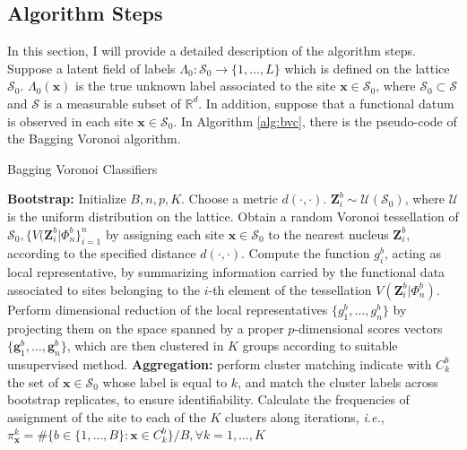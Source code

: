 \subsection{Algorithm Steps}
\label{subsec:algsteps}
In this section, I will provide a detailed description of the algorithm steps.
Suppose a latent field of labels $\Lambda_0:\mathcal{S}_0 \rightarrow \{1,\dots,L\}$ which is defined on the lattice $\mathcal{S}_0$. $\Lambda_0(\mathbf{x})$ is the true unknown label associated to the site $\mathbf{x}\in\mathcal{S}_0$, where $\mathcal{S}_0 \subset \mathcal{S}$ and $\mathcal{S}$ is a measurable subset of $\mathbb{R}^d$. In addition, suppose that a functional datum is observed in each site $\mathbf{x}\in\mathcal{S_0}$. In Algorithm \ref{alg:bvc}, there is the pseudo-code of the Bagging Voronoi algorithm.

\begin{algorithm}
\scriptsize
    \caption{\footnotesize{Bagging Voronoi Classifiers}}
    \label{alg:bvc}
    \begin{algorithmic}
    \STATE \textbf{Bootstrap:}
    \STATE Initialize $B, n, p, K$. Choose a metric $d(\cdot,\cdot).$
    \STATE $\mathbf{Z}_i^b\sim\mathcal{U}(\mathcal{S}_0)$, where $\mathcal{U}$ is the uniform distribution on the lattice. Obtain a random Voronoi tessellation of $\mathcal{S}_0, \{V(\mathbf{Z}_i^b|\Phi_n^b\}^n_{i=1}$ by assigning each site $\mathbf{x}\in \mathcal{S}_0$ to the nearest nucleus $\mathbf{Z}_i^b$, according to the specified distance $d(\cdot,\cdot).$
    \ENDFOR
    \STATE Compute the function $g_i^b$, acting as local representative, by summarizing information carried by the functional data associated to sites belonging to the $i$-th element of the tessellation $V(\mathbf{Z}_i^b|\Phi_n^b)$.
    \ENDFOR
    \STATE Perform dimensional reduction of the local representatives $\{g_1^b,\dots, g_n^b\}$ by projecting them on the space spanned by a proper $p$-dimensional scores vectors $\{\mathbf{g}_1^b,\dots, \mathbf{g}_n^b\}$, which are then clustered in $K$ groups according to suitable unsupervised method.
    \ENDFOR
    \STATE \textbf{Aggregation:} perform cluster matching
    \STATE indicate with $C_k^b$ the set of $\mathbf{x} \in \mathcal{S}_0$ whose label is equal to $k$, and match the cluster labels across bootstrap replicates, to ensure identifiability.
    \ENDFOR
    \ENDFOR
    \STATE Calculate the frequencies of assignment of the site to each of the $K$ clusters along iterations, \textit{i.e.}, $\pi_{\mathbf{x}}^k=\#\{b\in\{1,\dots,B\}:\mathbf{x}\in C_k^b\}/B, \forall k=1,\dots,K$
    \ENDFOR
    \end{algorithmic}
\end{algorithm} 


